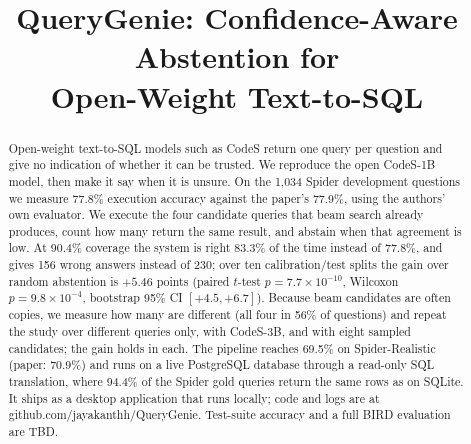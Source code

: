 \documentclass[conference]{IEEEtran}
\begin{document}
\title{QueryGenie: Confidence-Aware Abstention for\\Open-Weight Text-to-SQL}

\author{
\and
{}
\and
{}
\and
{}
}

\maketitle

\begin{abstract}
Open-weight text-to-SQL models such as CodeS return one query per question and give no indication of whether it can be trusted. We reproduce the open CodeS-1B model, then make it say when it is unsure. On the 1,034 Spider development questions we measure 77.8\% execution accuracy against the paper's 77.9\%, using the authors' own evaluator. We execute the four candidate queries that beam search already produces, count how many return the same result, and abstain when that agreement is low. At 90.4\% coverage the system is right 83.3\% of the time instead of 77.8\%, and gives 156 wrong answers instead of 230; over ten calibration/test splits the gain over random abstention is $+5.46$ points (paired $t$-test $p=7.7\times10^{-10}$, Wilcoxon $p=9.8\times10^{-4}$, bootstrap 95\% CI $[+4.5,+6.7]$). Because beam candidates are often copies, we measure how many are different (all four in 56\% of questions) and repeat the study over different queries only, with CodeS-3B, and with eight sampled candidates; the gain holds in each. The pipeline reaches 69.5\% on Spider-Realistic (paper: 70.9\%) and runs on a live PostgreSQL database through a read-only SQL translation, where 94.4\% of the Spider gold queries return the same rows as on SQLite. It ships as a desktop application that runs locally; code and logs are at github.com/jayakanthh/QueryGenie. Test-suite accuracy and a full BIRD evaluation are TBD.
\end{abstract}
\end{document}
